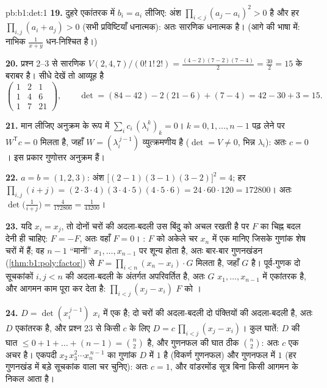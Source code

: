 \begin{solution}{pb:b1:det:1}
\textbf{19.} दुहरे एकांतरक में $b_i = a_i$ लीजिए: अंश $\prod_{i<j}(a_j -
a_i)^2 > 0$ है और हर $\prod_{i,j}(a_i + a_j) > 0$ (सभी प्रविष्टियाँ
धनात्मक): अतः सारणिक धनात्मक है। (आगे की भाषा में: नाभिक $\frac1{x+y}$
धन-निश्चित है।)

\textbf{20.} प्रश्न 2--3 से सारणिक $V(2,4,7)/(0!\,1!\,2!) =
\frac{(4-2)(7-2)(7-4)}{2} = \frac{30}{2} = 15$ के बराबर है। सीधे देखें तो
आव्यूह है
\[
\begin{pmatrix}
1 & 2 & 1\\
1 & 4 & 6\\
1 & 7 & 21
\end{pmatrix},
\qquad
\det = (84 - 42) - 2(21 - 6) + (7 - 4) = 42 - 30 + 3 = 15 .
\]

\textbf{21.} मान लीजिए अनुक्रम के रूप में $\sum_i c_i\,(\lambda_i^{\,k})_{k}
= 0$। $k = 0, 1, \dots, n-1$ पढ़ लेने पर $W^{\mathsf T}c = 0$ मिलता है, जहाँ
$W = (\lambda_i^{\,j-1})$ व्युत्क्रमणीय है ($\det = V \neq 0$, भिन्न
$\lambda_i$): अतः $c = 0$। इस प्रकार गुणोत्तर अनुक्रम  हैं।

\textbf{22.} $a = b = (1, 2, 3)$: अंश $\bigl[(2-1)(3-1) (3-2)\bigr]^2 = 4$;
हर $\prod_{i,j}(i + j) = (2\cdot3\cdot4)(3\cdot4\cdot5)(4\cdot5\cdot6) =
24\cdot60\cdot120 = 172800$। अतः $\det\bigl(\frac1{i+j}\bigr) =
\frac{4}{172800} = \frac1{43200}$।

\textbf{23.} यदि $x_i = x_j$, तो दोनों चरों की अदला-बदली उस बिंदु को अचल
रखती है पर $F$ का चिह्न बदल देनी ही चाहिए: $F = -F$, अतः वहाँ $F = 0$।
: $F$ को अकेले चर $x_n$ में एक  मानिए जिसके गुणांक शेष चरों
में हैं; वह $n - 1$ ``मानों'' $x_1, \dots, x_{n-1}$ पर शून्य होता है, अतः
बार-बार गुणनखंडन (\cref{thm:b1:poly:factor}) से $F = \prod_{i<n}(x_n -
x_i)\cdot G$ मिलता है, जहाँ $G$  है। पूर्व-गुणक दो सूचकांकों $i, j < n$
की अदला-बदली के अंतर्गत अपरिवर्तित है, अतः $G$ $x_1, \dots, x_{n-1}$ में
एकांतरक है, और आगमन काम पूरा कर देता है: $\prod_{i<j}(x_j - x_i)$ $F$ को
।

\textbf{24.} $D = \det(x_i^{\,j-1})$ $x_i$ में एक  है; दो चरों की
अदला-बदली दो पंक्तियों की अदला-बदली है, अतः $D$ एकांतरक है, और प्रश्न 23 से
किसी  $c$ के लिए $D = c\,\prod_{i<j}(x_j - x_i)$। कुल घातें: $D$ की घात
$\leq 0 + 1 + \dots + (n-1) = \binom n2$ है, और गुणनफल की घात ठीक $\binom
n2$: अतः $c$ एक अचर है। एकपदी $x_2\,x_3^2\cdots x_n^{\,n-1}$ का गुणांक $D$
में $1$ है (विकर्ण गुणनफल) और गुणनफल में $1$ (हर गुणनखंड में बड़े सूचकांक
वाला चर चुनिए): अतः $c = 1$, और वांडरमोंड सूत्र बिना किसी आगमन के निकल आता
है।


\end{solution}
